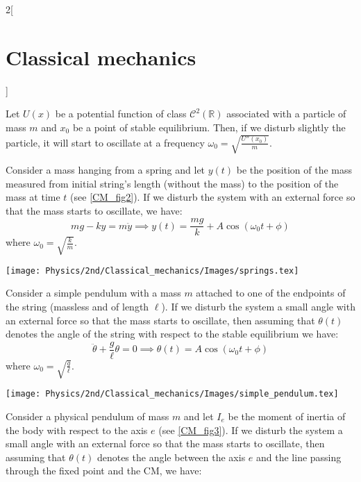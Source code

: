 \documentclass[../../../main.tex]{subfiles}
\begin{document}
\begin{multicols}{2}[\section{Classical mechanics}]
\begin{definition}
  \end{definition}
  \begin{prop}
    Let $U(x)$ be a potential function of class $\mathcal{C}^2(\mathbb{R})$ associated with a particle of mass $m$ and $x_0$ be a point of stable equilibrium. Then, if we disturb slightly the particle, it will start to oscillate at a frequency $\omega_0=\sqrt{\frac{U''(x_0)}{m}}$.
  \end{prop}
  \begin{prop}
    Consider a mass hanging from a spring and let $y(t)$ be the position of the mass measured from initial string's length (without the mass) to the position of the mass at time $t$ (see \cref{CM_fig2}). If we disturb the system with an external force so that the mass starts to oscillate, we have: $$mg-ky=m\ddot{y}\implies y(t)=\frac{mg}{k}+A\cos(\omega_0t+\phi)$$ where $\omega_0=\sqrt{\frac{k}{m}}$.
    \begin{center}
      \begin{minipage}{\linewidth}
        \centering
        \texttt{[image: Physics/2nd/Classical\_mechanics/Images/springs.tex]}
        \label{CM_fig2}
      \end{minipage}
    \end{center}
  \end{prop}
  \begin{prop}
    Consider a simple pendulum with a mass $m$ attached to one of the endpoints of the string (massless and of length $\ell$). If we disturb the system a small angle with an external force so that the mass starts to oscillate, then assuming that $\theta(t)$ denotes the angle of the string with respect to the stable equilibrium we have:
    $$\ddot{\theta}+\frac{g}{\ell}\theta=0\implies\theta(t)=A\cos(\omega_0t+\phi)$$ where $\omega_0=\sqrt{\frac{g}{\ell}}$.
    \begin{center}
      \begin{minipage}{\linewidth}
        \centering
        \texttt{[image: Physics/2nd/Classical\_mechanics/Images/simple\_pendulum.tex]}
      \end{minipage}
    \end{center}
  \end{prop}
  \begin{prop}
    Consider a physical pendulum of mass $m$ and let $I_e$ be the moment of inertia of the body with respect to the axis $e$ (see \cref{CM_fig3}). If we disturb the system a small angle with an external force so that the mass starts to oscillate, then assuming that $\theta(t)$ denotes the angle between the axis $e$ and the line passing through the fixed point and the CM, we have:

\end{prop}
\end{multicols}
\end{document}
